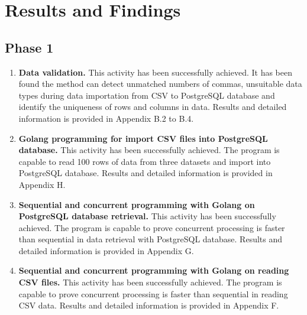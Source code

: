 \chapter{Results and Findings} 

\label{Chapter6} 


\doublespacing



\section{Phase 1}

\begin{enumerate}[topsep=0pt,itemsep=-1ex,partopsep=1ex,parsep=1.5ex]
	
	\item \textbf{Data validation.}
	This activity has been successfully achieved. It has been found the method can detect unmatched numbers of commas, unsuitable data types during data importation from CSV to PostgreSQL database and identify the uniqueness of rows and columns in data. Results and detailed information is provided in Appendix B.2 to B.4.
	
	\item \textbf{Golang programming for import CSV files into PostgreSQL database.}
	This activity has been successfully achieved. The program is capable to read 100 rows of data from three datasets and import into PostgreSQL database. Results and detailed information is provided in Appendix H.
	
	\pagebreak
	
	\item \textbf{Sequential and concurrent programming with Golang on PostgreSQL database retrieval.}
	This activity has been successfully achieved. The program is capable to prove concurrent processing is faster than sequential in data retrieval with PostgreSQL database. Results and detailed information is provided in Appendix G.
	
	\item \textbf{Sequential and concurrent programming with Golang on reading CSV files.}
	This activity has been successfully achieved. The program is capable to prove concurrent processing is faster than sequential in reading CSV data. Results and detailed information is provided in Appendix F.
	
\end{enumerate}

